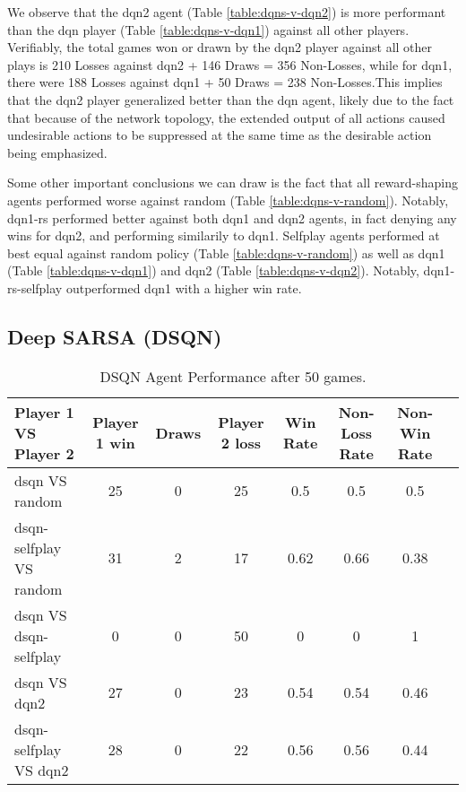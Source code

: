 \documentclass[../report.tex]{subfiles}
\begin{document}
We observe that the dqn2 agent (Table \ref{table:dqns-v-dqn2}) is more performant than the dqn player (Table \ref{table:dqns-v-dqn1}) against all other players. Verifiably, the total games won or drawn by the dqn2 player against all other plays is 210 Losses against dqn2 + 146 Draws = 356 Non-Losses, while for dqn1, there were 188 Losses against dqn1 + 50 Draws =  238 Non-Losses.This implies that the dqn2 player generalized better than the dqn agent, likely due to the fact that because of the network topology, the extended output of all actions caused undesirable actions to be suppressed at the same time as the desirable action being emphasized. 

Some other important conclusions we can draw is the fact that all reward-shaping agents performed worse against random (Table \ref{table:dqns-v-random}). Notably, dqn1-rs performed better against both dqn1 and dqn2 agents, in fact denying any wins for dqn2, and performing similarily to dqn1. Selfplay agents performed at best equal against random policy (Table \ref{table:dqns-v-random}) as well as dqn1 (Table \ref{table:dqns-v-dqn1}) and dqn2 (Table \ref{table:dqns-v-dqn2}). Notably, dqn1-rs-selfplay outperformed dqn1 with a higher win rate.

\subsection{Deep SARSA (DSQN)}

\begin{table}[!htbp]
    \centering
    \caption{DSQN Agent Performance after 50 games.}\label{table:dsqn}
    \begin{tabular}{lccccccc}
        \toprule
        Player 1 VS Player 2            & Player 1 win & Draws & Player 2 loss & Win Rate & Non-Loss Rate & Non-Win Rate \\
        \midrule
        dsqn VS random                  & 25    & 0    & 25      & 0.5        & 0.5             & 0.5            \\
        dsqn-selfplay VS random         & 31   & 2     & 17     & 0.62     & 0.66          & 0.38         \\
        dsqn VS dsqn-selfplay           & 0   & 0     & 50     & 0     & 0         & 1         \\
        dsqn VS dqn2                    & 27  & 0     & 23     & 0.54     & 0.54          & 0.46         \\
        dsqn-selfplay VS dqn2           & 28   & 0     & 22     & 0.56      & 0.56           & 0.44          \\
       \bottomrule
    \end{tabular}
\end{table}
\end{document}
